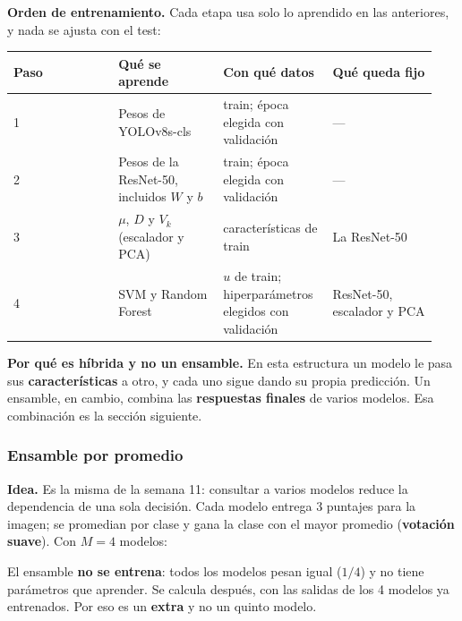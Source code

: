 \textbf{Orden de entrenamiento.} Cada etapa usa solo lo aprendido en las anteriores, y nada se ajusta con el test:

\begin{table}[htbp]
\centering\small
\begin{tabular}{p{0.235\linewidth}p{0.235\linewidth}p{0.235\linewidth}p{0.235\linewidth}}
\toprule
Paso & Qué se aprende & Con qué datos & Qué queda fijo \\
\midrule
1 & Pesos de YOLOv8s-cls & train; época elegida con validación & — \\
2 & Pesos de la ResNet-50, incluidos $W$ y $b$ & train; época elegida con validación & — \\
3 & $\mu$, $D$ y $V_k$ (escalador y PCA) & características de train & La ResNet-50 \\
4 & SVM y Random Forest & $u$ de train; hiperparámetros elegidos con validación & ResNet-50, escalador y PCA \\
\bottomrule
\end{tabular}
\end{table}


\textbf{Por qué es híbrida y no un ensamble.} En esta estructura un modelo le pasa sus \textbf{características} a otro, y cada uno sigue dando su propia predicción. Un ensamble, en cambio, combina las \textbf{respuestas finales} de varios modelos. Esa combinación es la sección siguiente.

\subsubsection{Ensamble por promedio}
\label{mm:3.6}

\textbf{Idea.} Es la misma de la semana 11: consultar a varios modelos reduce la dependencia de una sola decisión. Cada modelo entrega 3 puntajes para la imagen; se promedian por clase y gana la clase con el mayor promedio (\textbf{votación suave}). Con $M = 4$ modelos:

\begin{center}
\end{center}

El ensamble \textbf{no se entrena}: todos los modelos pesan igual ($1/4$) y no tiene parámetros que aprender. Se calcula después, con las salidas de los 4 modelos ya entrenados. Por eso es un \textbf{extra} y no un quinto modelo.

